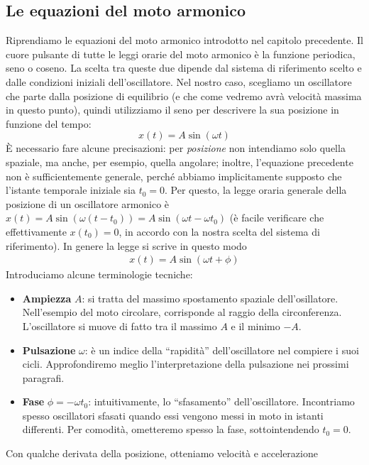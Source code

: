 \subsection{Le equazioni del moto armonico}
Riprendiamo le equazioni del moto armonico introdotto nel capitolo precedente.
Il cuore pulsante di tutte le leggi orarie del moto armonico è la funzione
periodica, seno o coseno. La scelta tra queste due dipende dal sistema di
riferimento scelto e dalle condizioni iniziali dell'oscillatore. Nel nostro
caso, scegliamo un oscillatore che parte dalla posizione di equilibrio
(e che come vedremo avrà velocità massima in questo punto), quindi utilizziamo
il seno per descrivere la sua posizione in funzione del tempo:
\[ x(t) = A\sin(\omega t) \]
È necessario fare alcune precisazioni: per \textit{posizione} non intendiamo
solo quella spaziale, ma anche, per esempio, quella angolare; inoltre,
l'equazione precedente non è sufficientemente generale, perché abbiamo
implicitamente supposto che l'istante temporale iniziale sia $t_0 = 0$. Per
questo, la legge oraria generale della posizione di un oscillatore armonico
è $x(t) = A\sin(\omega (t - t_0)) = A\sin(\omega t - \omega t_0)$ (è facile
verificare che effettivamente $x(t_0) = 0$, in accordo con la nostra scelta
del sistema di riferimento). In genere la legge si scrive in questo modo
\begin{align}
    x(t) = A\sin(\omega t + \phi)
\end{align}
Introduciamo alcune terminologie tecniche:
\begin{itemize}
    \item \textbf{Ampiezza} $A$: si tratta del massimo spostamento spaziale
    dell'osillatore. Nell'esempio del moto circolare, corrisponde al raggio
    della circonferenza. L'oscillatore si muove di fatto tra il massimo $A$
    e il minimo $-A$.

    \item \textbf{Pulsazione} $\omega$: è un indice della ``rapidità''
    dell'oscillatore nel compiere i suoi cicli. Approfondiremo meglio
    l'interpretazione della pulsazione nei prossimi paragrafi.
    
    \item \textbf{Fase} $\phi = -\omega t_0$: intuitivamente, lo
    ``sfasamento'' dell'oscillatore. Incontriamo spesso oscillatori sfasati
    quando essi vengono messi in moto in istanti differenti. Per comodità,
    ometteremo spesso la fase, sottointendendo $t_0 = 0$.
\end{itemize}
Con qualche derivata della posizione, otteniamo velocità e accelerazione
